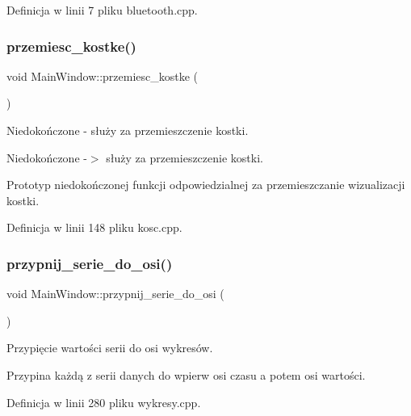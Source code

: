 Definicja w linii 7 pliku bluetooth.\+cpp.

\mbox{\label{class_main_window_a7d6f7650da80dc76a49f89be8a87e856}} 
\subsubsection{\texorpdfstring{przemiesc\+\_\+kostke()}{przemiesc\_kostke()}}
{\footnotesize\ttfamily void Main\+Window\+::przemiesc\+\_\+kostke (\begin{DoxyParamCaption}{ }\end{DoxyParamCaption})}



Niedokończone -\/ służy za przemieszczenie kostki. 

Niedokończone -\/$>$ służy za przemieszczenie kostki.

Prototyp niedokończonej funkcji odpowiedzialnej za przemieszczanie wizualizacji kostki. 

Definicja w linii 148 pliku kosc.\+cpp.

\mbox{\label{class_main_window_a07cf16cd47bfdef75cebcfc3e2e02c4d}} 
\subsubsection{\texorpdfstring{przypnij\+\_\+serie\+\_\+do\+\_\+osi()}{przypnij\_serie\_do\_osi()}}
{\footnotesize\ttfamily void Main\+Window\+::przypnij\+\_\+serie\+\_\+do\+\_\+osi (\begin{DoxyParamCaption}{ }\end{DoxyParamCaption})}



Przypięcie wartości serii do osi wykresów. 

Przypina każdą z serii danych do wpierw osi czasu a potem osi wartości. 

Definicja w linii 280 pliku wykresy.\+cpp.

\mbox{\label{class_main_window_a36136fd65f9fbac0ed55909c48657958}} 
